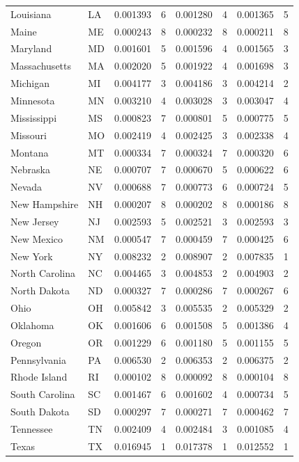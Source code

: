 \documentclass{article}
\begin{document}
\begin{table}[H]
\begin{tabular}{llrrrrrr}
Louisiana & LA & 0.001393 & 6 & 0.001280 & 4 & 0.001365 & 5 \\
Maine & ME & 0.000243 & 8 & 0.000232 & 8 & 0.000211 & 8 \\
Maryland & MD & 0.001601 & 5 & 0.001596 & 4 & 0.001565 & 3 \\
Massachusetts & MA & 0.002020 & 5 & 0.001922 & 4 & 0.001698 & 3 \\
Michigan & MI & 0.004177 & 3 & 0.004186 & 3 & 0.004214 & 2 \\
Minnesota & MN & 0.003210 & 4 & 0.003028 & 3 & 0.003047 & 4 \\
Mississippi & MS & 0.000823 & 7 & 0.000801 & 5 & 0.000775 & 5 \\
Missouri & MO & 0.002419 & 4 & 0.002425 & 3 & 0.002338 & 4 \\
Montana & MT & 0.000334 & 7 & 0.000324 & 7 & 0.000320 & 6 \\
Nebraska & NE & 0.000707 & 7 & 0.000670 & 5 & 0.000622 & 6 \\
Nevada & NV & 0.000688 & 7 & 0.000773 & 6 & 0.000724 & 5 \\
New Hampshire & NH & 0.000207 & 8 & 0.000202 & 8 & 0.000186 & 8 \\
New Jersey & NJ & 0.002593 & 5 & 0.002521 & 3 & 0.002593 & 3 \\
New Mexico & NM & 0.000547 & 7 & 0.000459 & 7 & 0.000425 & 6 \\
New York & NY & 0.008232 & 2 & 0.008907 & 2 & 0.007835 & 1 \\
North Carolina & NC & 0.004465 & 3 & 0.004853 & 2 & 0.004903 & 2 \\
North Dakota & ND & 0.000327 & 7 & 0.000286 & 7 & 0.000267 & 6 \\
Ohio & OH & 0.005842 & 3 & 0.005535 & 2 & 0.005329 & 2 \\
Oklahoma & OK & 0.001606 & 6 & 0.001508 & 5 & 0.001386 & 4 \\
Oregon & OR & 0.001229 & 6 & 0.001180 & 5 & 0.001155 & 5 \\
Pennsylvania & PA & 0.006530 & 2 & 0.006353 & 2 & 0.006375 & 2 \\
Rhode Island & RI & 0.000102 & 8 & 0.000092 & 8 & 0.000104 & 8 \\
South Carolina & SC & 0.001467 & 6 & 0.001602 & 4 & 0.000734 & 5 \\
South Dakota & SD & 0.000297 & 7 & 0.000271 & 7 & 0.000462 & 7 \\
Tennessee & TN & 0.002409 & 4 & 0.002484 & 3 & 0.001085 & 4 \\
Texas & TX & 0.016945 & 1 & 0.017378 & 1 & 0.012552 & 1 \\

\end{tabular}
\end{table}
\end{document}
